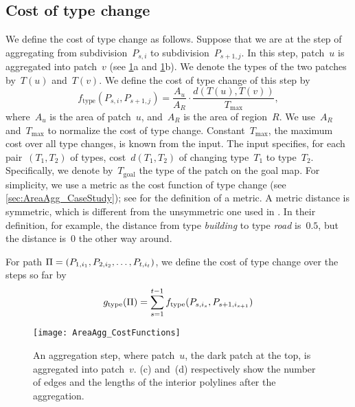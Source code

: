\documentclass[acmsmall,natbib=false]{acmart}
\begin{document}
\subsection{Cost of type change}
\label{sec:AreaAgg_f_type}

We define the cost of type change as follows.
Suppose that we are at the step of aggregating 
from subdivision~$P_{s,i}$ to subdivision~$P_{s+1,j}$. 
In this step, patch~$u$ is aggregated into patch~$v$
(see \figs\ref{fig:AreaAgg_FirstStep}a 
and \ref{fig:AreaAgg_FirstStep}b).
We denote the types of the two patches by~$T(u)$ and~$T(v)$. 
We define the cost of type change of this step by
\begin{equation}
\label{eq:f_type}
f_\mathrm{type}(P_{s,i},P_{s+1,j})=\frac{A_{u}}{A_R}
\cdot
\frac{d(T(u),T(v))}{T_{\max}},
\end{equation}
where~$A_u$ is the area of patch~$u$, 
and~$A_R$ is the area of region~$R$.
We use~$A_R$ and~$T_{\max}$ 
to normalize the cost of type change. 
Constant~$T_{\max}$, the maximum cost over all type changes,  
is known from the input. 
The input specifies, for each pair~$(T_1,T_2)$ of types, 
cost~$d(T_1,T_2)$ of changing type~$T_1$ to type~$T_2$.
Specifically, we denote by~$T_\mathrm{goal}$ the type of 
the patch on the goal map.
For simplicity, we use a metric 
as the cost function of type change
(see \sect\ref{sec:AreaAgg_CaseStudy}); 
see \textcite[chapter 2]{Choudhary1992Elements}
for the definition of a metric.
A metric distance is symmetric, 
which is different from the unsymmetric one used in
\textcite{Dilo2009tGAP}.
In their definition, for example, 
the distance from type \emph{building} to type \emph{road} is~$0.5$,
but the distance is~$0$ the other way around.

For path $\Pi=(P_{1,i_1}, P_{2,i_2}, \dots, 
P_{t,i_{t}})$,
we define the cost of type change over the steps so far by
\begin{equation}
\label{eq:g_type}
g_\mathrm{type}(\Pi)=
\sum_{s=1}^{t-1}f_\mathrm{type}(P_{s,i_s},P_{s+1,i_{s+1}})
\end{equation}

\begin{figure}[tb]
\centering
\texttt{[image: AreaAgg\_CostFunctions]}
\caption{An aggregation step, 
	where patch~$u$, the dark patch at the top,
	is aggregated into patch~$v$.
	\figs(c) and~(d) respectively show the number of 
	edges and the lengths of the interior polylines after 
	the aggregation.}
\label{fig:AreaAgg_FirstStep}	
\end{figure}
\end{document}
